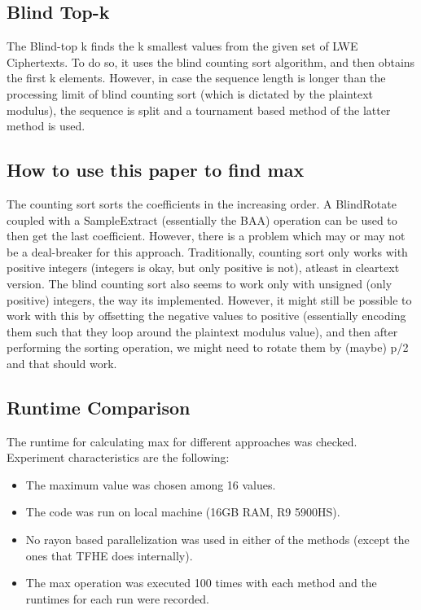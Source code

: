 \documentclass{report}
\begin{document}
\subsection{Blind Top-k}
The Blind-top k finds the k smallest values from the given set of LWE Ciphertexts. To do so, it uses the blind counting sort algorithm, and then obtains the first k elements. However, in case the sequence length is longer than the processing limit of blind counting sort (which is dictated by the plaintext modulus), the sequence is split and a tournament based method of the latter method is used.

\subsection{How to use this paper to find max}
The counting sort sorts the coefficients in the increasing order. A BlindRotate coupled with a SampleExtract (essentially the BAA) operation can be used to then get the last coefficient. However, there is a problem which may or may not be a deal-breaker for this approach. Traditionally, counting sort only works with positive integers (integers is okay, but only positive is not), atleast in cleartext version. The blind counting sort also seems to work only with unsigned (only positive) integers, the way its implemented. However, it might still be possible to work with this by offsetting the negative values to positive (essentially encoding them such that they loop around the plaintext modulus value), and then after performing the sorting operation, we might need to rotate them by (maybe) p/2 and that should work.

\subsection{Runtime Comparison}
The runtime for calculating max for different approaches was checked. Experiment characteristics are the following:
\begin{itemize}
	\item The maximum value was chosen among 16 values.
	\item The code was run on local machine (16GB RAM, R9 5900HS).
	\item No rayon based parallelization was used in either of the methods (except the ones that TFHE does internally).
	\item  The max operation was executed 100 times with each method and the runtimes for each run were recorded.
\end{itemize}
\end{document}
